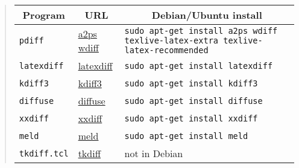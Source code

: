 \documentclass[%
oneside,                 %
final,                   %
10pt]{article}
\begin{document}
\begin{quote}\begin{tabular}{lll}
\hline
\multicolumn{1}{c}{ Program } & \multicolumn{1}{c}{ URL } & \multicolumn{1}{c}{ Debian/Ubuntu install } \\
\hline
{\fontsize{10pt}{10pt}\Verb!pdiff!}                                                                              & \href{{http://www.gnu.org/software/a2ps/}}{a2ps} \href{{http://www.gnu.org/software/wdiff/}}{wdiff} & {\fontsize{10pt}{10pt}\Verb!sudo apt-get install a2ps wdiff texlive-latex-extra texlive-latex-recommended!}      \\
{\fontsize{10pt}{10pt}\Verb!latexdiff!}                                                                          & \href{{http://www.ctan.org/pkg/latexdiff}}{latexdiff}                                          & {\fontsize{10pt}{10pt}\Verb!sudo apt-get install latexdiff!}                                                     \\
{\fontsize{10pt}{10pt}\Verb!kdiff3!}                                                                             & \href{{http://kdiff3.sourceforge.net/}}{kdiff3}                                                & {\fontsize{10pt}{10pt}\Verb!sudo apt-get install kdiff3!}                                                        \\
{\fontsize{10pt}{10pt}\Verb!diffuse!}                                                                            & \href{{http://diffuse.sourceforge.net/}}{diffuse}                                              & {\fontsize{10pt}{10pt}\Verb!sudo apt-get install diffuse!}                                                       \\
{\fontsize{10pt}{10pt}\Verb!xxdiff!}                                                                             & \href{{http://xxdiff.sourceforge.net/local/}}{xxdiff}                                          & {\fontsize{10pt}{10pt}\Verb!sudo apt-get install xxdiff!}                                                        \\
{\fontsize{10pt}{10pt}\Verb!meld!}                                                                               & \href{{http://meldmerge.org/}}{meld}                                                           & {\fontsize{10pt}{10pt}\Verb!sudo apt-get install meld!}                                                          \\
{\fontsize{10pt}{10pt}\Verb!tkdiff.tcl!}                                                                         & \href{{https://sourceforge.net/projects/tkdiff/}}{tkdiff}                                      & not in Debian                                                                             \\
\hline
\end{tabular}\end{quote}
\end{document}
